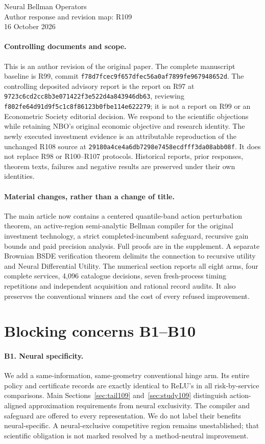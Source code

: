 \documentclass[11pt]{article}
\begin{document}
\begin{center}{\Large Neural Bellman Operators}\\[4pt]
{\large Author response and revision map: R109}\\16 October 2026\end{center}

\paragraph{Controlling documents and scope.}
This is an author revision of the original paper. The complete manuscript baseline is R99, commit \nolinkurl{f78d7fcec9f657dfec56a0af7899fe967948652d}. The controlling deposited advisory report is the report on R97 at \nolinkurl{9723c6cd2cc8b3e071422f3e522d4a843946db63}, reviewing \nolinkurl{f802fe64d91d9f5c1c8f86123b0fbe114e622279}; it is not a report on R99 or an Econometric Society editorial decision. We respond to the scientific objections while retaining NBO's original economic objective and research identity. The newly executed investment evidence is an attributable reproduction of the unchanged R108 source at \nolinkurl{29180a4ce4a6db7298e7458ecdfff3da08abb08f}. It does not replace R98 or R100--R107 protocols. Historical reports, prior responses, theorem texts, failures and negative results are preserved under their own identities.

\paragraph{Material changes, rather than a change of title.}
The main article now contains a centered quantile-band action perturbation theorem, an active-region semi-analytic Bellman compiler for the original investment technology, a strict completed-incumbent safeguard, recursive gain bounds and paid precision analysis. Full proofs are in the supplement. A separate Brownian BSDE verification theorem delimits the connection to recursive utility and Neural Differential Utility. The numerical section reports all eight arms, four complete services, 4,096 catalogue decisions, seven fresh-process timing repetitions and independent acquisition and rational record audits. It also preserves the conventional winners and the cost of every refused improvement.

\section*{Blocking concerns B1--B10}
\paragraph{B1. Neural specificity.}
We add a same-information, same-geometry conventional hinge arm. Its entire policy and certificate records are exactly identical to ReLU's in all risk-by-service comparisons. Main Sections~\ref{sec:tail109} and~\ref{sec:study109} distinguish action-aligned approximation requirements from neural exclusivity. The compiler and safeguard are offered to every representation. We do not label their benefits neural-specific. A neural-exclusive competitive region remains unestablished; that scientific obligation is not marked resolved by a method-neutral improvement.
\end{document}
